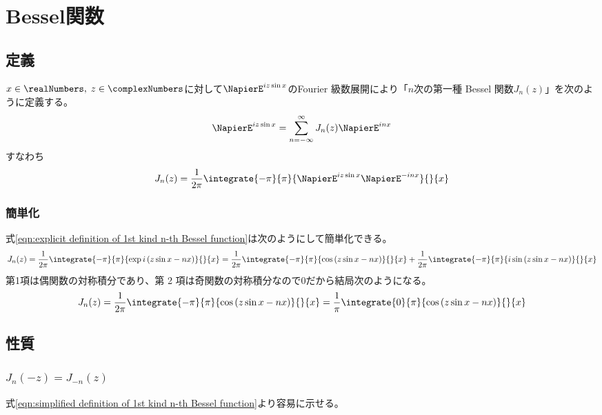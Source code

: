 \chapter{Bessel関数}
    \section{定義}
        $x\in\realNumbers,\;z\in\complexNumbers$に対して$\NapierE^{iz\sin x}$のFourier 級数展開により「$n$次の第一種 Bessel 関数$J_n(z)$」を次のように定義する。
        \begin{equation}
            \label{eqn:implicit definition of 1st kind n-th Bessel function}
            \NapierE^{iz\sin x} = \sum_{n = -\infty}^\infty J_n(z)\NapierE^{inx}
        \end{equation}
        すなわち
        \begin{equation}
            \label{eqn:explicit definition of 1st kind n-th Bessel function}
            J_n(z) = \frac{1}{2\pi}\integrate{-\pi}{\pi}{\NapierE^{iz\sin x}\NapierE^{-inx}}{}{x}
        \end{equation}
        \subsection{簡単化}
            式\eqref{eqn:explicit definition of 1st kind n-th Bessel function}は次のようにして簡単化できる。
            \[ J_n(z) = \frac{1}{2\pi}\integrate{-\pi}{\pi}{\exp i\left(z\sin x -nx\right)}{}{x} = \frac{1}{2\pi}\integrate{-\pi}{\pi}{\cos\left(z\sin x -nx\right)}{}{x} + \frac{1}{2\pi}\integrate{-\pi}{\pi}{i\sin\left(z\sin x -nx\right)}{}{x} \]
            第1項は偶関数の対称積分であり、第 2 項は奇関数の対称積分なので0だから結局次のようになる。
            \begin{equation}
                \label{eqn:simplified definition of 1st kind n-th Bessel function}
                J_n(z) = \frac{1}{2\pi}\integrate{-\pi}{\pi}{\cos\left(z\sin x -nx\right)}{}{x} = \frac{1}{\pi}\integrate{0}{\pi}{\cos\left(z\sin x -nx\right)}{}{x}
            \end{equation}
    \section{性質}
        \subsection{\texorpdfstring{$J_n(-z) = J_{-n}(z)$}{y 軸に関する鏡像反転}}
            式\eqref{eqn:simplified definition of 1st kind n-th Bessel function}より容易に示せる。
